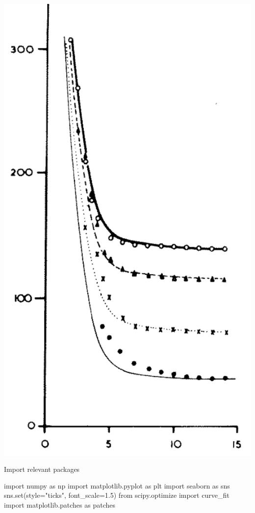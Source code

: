 \documentclass[
  letterpaper,
  DIV=11,
  numbers=noendperiod]{scrreprt}
\newenvironment{Shaded}{\begin{snugshade}}{\end{snugshade}}
\newcommand{\BuiltInTok}[1]{\textcolor[rgb]{0.00,0.23,0.31}{#1}}
\newcommand{\FloatTok}[1]{\textcolor[rgb]{0.68,0.00,0.00}{#1}}
\newcommand{\ImportTok}[1]{\textcolor[rgb]{0.00,0.46,0.62}{#1}}
\newcommand{\NormalTok}[1]{\textcolor[rgb]{0.00,0.23,0.31}{#1}}
\newcommand{\OperatorTok}[1]{\textcolor[rgb]{0.37,0.37,0.37}{#1}}
\newcommand{\StringTok}[1]{\textcolor[rgb]{0.13,0.47,0.30}{#1}}
\begin{document}
\includegraphics{archive/figures/nassif-16percent-slope.png}

Import relevant packages

\begin{Shaded}
\begin{Highlighting}[]
\ImportTok{import}\NormalTok{ numpy }\ImportTok{as}\NormalTok{ np}
\ImportTok{import}\NormalTok{ matplotlib.pyplot }\ImportTok{as}\NormalTok{ plt}
\ImportTok{import}\NormalTok{ seaborn }\ImportTok{as}\NormalTok{ sns}
\NormalTok{sns.}\BuiltInTok{set}\NormalTok{(style}\OperatorTok{=}\StringTok{"ticks"}\NormalTok{, font\_scale}\OperatorTok{=}\FloatTok{1.5}\NormalTok{)}
\ImportTok{from}\NormalTok{ scipy.optimize }\ImportTok{import}\NormalTok{ curve\_fit}
\ImportTok{import}\NormalTok{ matplotlib.patches }\ImportTok{as}\NormalTok{ patches}
\end{Highlighting}
\end{Shaded}
\end{document}
